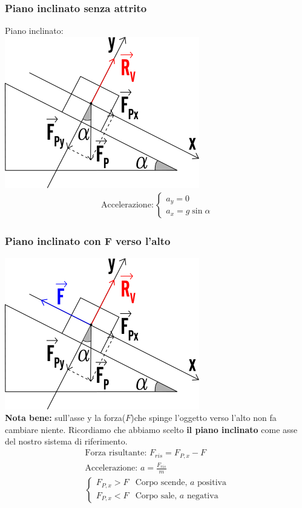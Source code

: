 \subsubsection{Piano inclinato senza attrito}
Piano inclinato: \\
\includegraphics[width=0.75 \linewidth]{Dinamica/reazione-vincolare-nel-piano-inclinato.png} \\
\begin{gather*}
\text{Accelerazione}: \begin{cases}
    a_y = 0 \\
    a_x = g \sin{\alpha}
\end{cases}
\end{gather*}

\subsubsection{Piano inclinato con F verso l'alto}
\includegraphics[width=0.75 \linewidth]{Dinamica/variante-piano-inclinato-senza-attrito.png} \\
\textbf{Nota bene: } sull'asse y la forza($F$)che spinge l'oggetto verso l'alto non fa cambiare niente. Ricordiamo che abbiamo scelto \textbf{il piano inclinato} come asse del nostro sistema di riferimento.
\begin{gather*}
    \text{Forza risultante: } F_{ris} = F_{P, x} - F \\
    \text{Accelerazione: } a = \frac{F_{ris}}{m} \\
    \begin{cases}
        F_{P, x} > F & \text{Corpo scende, $a$ positiva} \\
        F_{P, x} < F & \text{Corpo sale, $a$ negativa}
    \end{cases}
\end{gather*}
